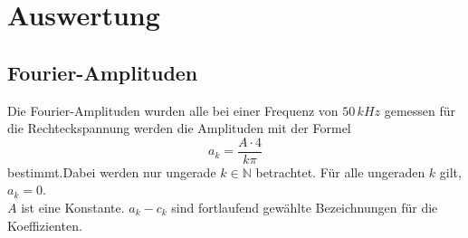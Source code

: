 \section{Auswertung}
\subsection{Fourier-Amplituden}
Die Fourier-Amplituden wurden alle bei einer Frequenz von $50\, kHz$ gemessen
 für die Rechteckspannung werden die Amplituden mit der Formel
\begin{equation}
  a_k = \frac{A \cdot 4}{k \pi}
\end{equation}
bestimmt.Dabei werden nur ungerade $k \in \mathds{N}$ betrachtet.
Für alle ungeraden $k$ gilt, $a_k =0$. \\
$A$ ist eine Konstante.
$a_k - c_k$  sind fortlaufend gewählte Bezeichnungen für die Koeffizienten.

